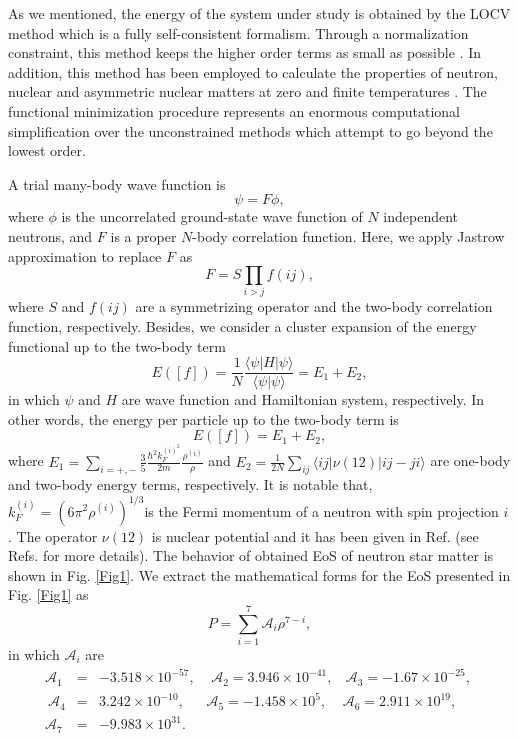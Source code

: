 \documentclass[aps]{revtex4}
\begin{document}
As we mentioned, the energy of the system under study is obtained by the
LOCV method which is a fully self-consistent formalism. Through a
normalization constraint, this method keeps the higher order terms as small
as possible \cite{Owen}. In addition, this method has been employed to
calculate the properties of neutron, nuclear and asymmetric nuclear matters
at zero and finite temperatures \cite{Owen,Modarres,Howes}. The functional
minimization procedure represents an enormous computational simplification
over the unconstrained methods which attempt to go beyond the lowest order.

A trial many-body wave function is
\begin{equation}
\psi =F\phi ,
\end{equation}%
where $\phi $ is the uncorrelated ground-state wave function of $N$
independent neutrons, and $F$ is a proper $N$-body correlation function.
Here, we apply Jastrow approximation \cite{Jastrow} to replace $F$ as
\begin{equation}
F=S\prod_{i>j}f(ij),
\end{equation}%
where $S$ and $f(ij)$ are a symmetrizing operator and the two-body
correlation function, respectively. Besides, we consider a cluster expansion
of the energy functional up to the two-body term
\begin{equation}
E([f])=\frac{1}{N}\frac{\langle \psi |H|\psi \rangle }{\langle \psi |\psi
\rangle }=E_{1}+E_{2},
\end{equation}%
in which $\psi $ and $H$ are wave function and Hamiltonian system,
respectively. In other words, the energy per particle up to the two-body
term is
\begin{equation}
E([f])=E_{1}+E_{2},
\end{equation}%
where $E_{1}=\sum_{i=+,-}\frac{3}{5}\frac{\hbar ^{2}k_{F}^{(i)^{2}}}{2m}%
\frac{\rho ^{(i)}}{\rho }$ and $E_{2}=\frac{1}{2N}\sum_{ij}\langle ij|\nu
(12)|ij-ji\rangle $ are one-body and two-body energy terms, respectively. It
is notable that, $k_{F}^{(i)}=\left( 6\pi ^{2}\rho ^{(i)}\right) ^{1/3}$is
the Fermi momentum of a neutron with spin projection $i$. The operator $\nu
(12)$ is nuclear potential and it has been given in Ref. \cite{Bordbar044310}
(see Refs. \cite{Bordbar1998} for more details). The behavior of obtained
EoS of neutron star matter is shown in Fig. \ref{Fig1}. We extract the
mathematical forms for the EoS presented in Fig. \ref{Fig1} as
\begin{equation}
P=\sum_{i=1}^{7}\mathcal{A}_{i}\rho ^{7-i},  \label{EoS}
\end{equation}%
in which $\mathcal{A}_{i}$ are%
\begin{eqnarray*}
\mathcal{A}_{1} &=&-3.518\times 10^{-57},\ \ \ \ \ \mathcal{A}%
_{2}=3.946\times 10^{-41},\ \ \ \ \mathcal{A}_{3}=-1.67\times 10^{-25},\  \\
\ \mathcal{A}_{4} &=&3.242\times 10^{-10},\ \ \ \ \ \ \ \mathcal{A}%
_{5}=-1.458\times 10^{5},\ \ \ \ \ \mathcal{A}_{6}=2.911\times 10^{19}, \\
\mathcal{A}_{7} &=&-9.983\times 10^{31}.
\end{eqnarray*}
\end{document}
